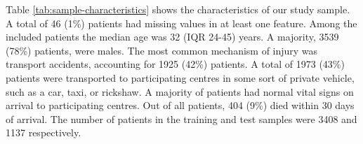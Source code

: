\documentclass[10pt,letterpaper]{article}\usepackage[]{graphicx}\usepackage[]{color}
\begin{document}
Table \ref{tab:sample-characteristics} shows the characteristics of our study
sample. A total of 46 (1\%) patients had
missing values in at least one feature. Among the included patients the median age
was 32 (IQR 24-45) years. A majority, 3539 (78\%)
patients, were males. The most common mechanism of injury was transport
accidents, accounting for 1925 (42\%)
patients. A total of 1973 (43\%) patients were
transported to participating centres in some sort of private vehicle, such as a
car, taxi, or rickshaw. A majority of patients had normal vital signs on arrival
to participating centres. Out of all patients, 404 (9\%)
died within 30 days of arrival. The number of patients in the training and test
samples were 3408 and 1137
respectively.

\end{document}
